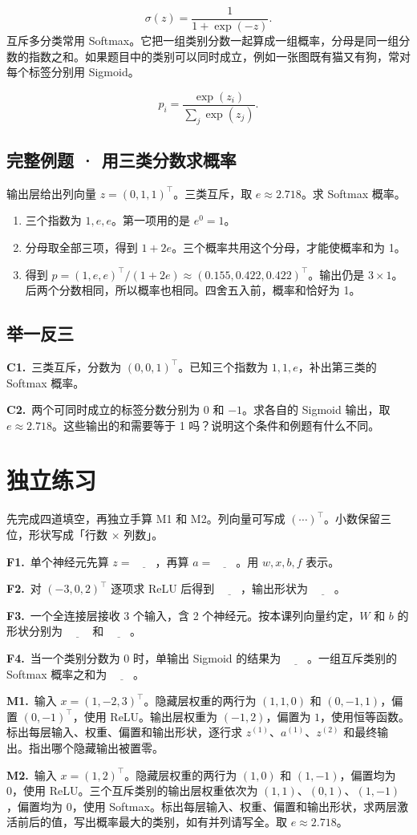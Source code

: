 \documentclass[UTF8,a4paper,11pt]{ctexart}
\newcommand{\PracticeQuestion}[3]{\par\Needspace{4\baselineskip}\noindent\begin{minipage}{\linewidth}\textbf{#1.}\ #2\par\noindent\rule{0pt}{#3mm}\par\end{minipage}\par}
\begin{document}
\[\sigma(z)=\frac{1}{1+\exp(-z)}.\]
互斥多分类常用 Softmax。它把一组类别分数一起算成一组概率，分母是同一组分数的指数之和。如果题目中的类别可以同时成立，例如一张图既有猫又有狗，常对每个标签分别用 Sigmoid。

\[p_i=\frac{\exp(z_i)}{\sum_j\exp(z_j)}.\]
\subsection{完整例题 · 用三类分数求概率}
输出层给出列向量 $z=(0,1,1)^\top$。三类互斥，取 $e\approx2.718$。求 Softmax 概率。

\begin{enumerate}
\item 三个指数为 $1,e,e$。第一项用的是 $e^0=1$。
\item 分母取全部三项，得到 $1+2e$。三个概率共用这个分母，才能使概率和为 1。
\item 得到 $p=(1,e,e)^\top/(1+2e)\approx(0.155,0.422,0.422)^\top$。输出仍是 $3\times1$。后两个分数相同，所以概率也相同。四舍五入前，概率和恰好为 1。
\end{enumerate}
\subsection{举一反三}
\PracticeQuestion{C1}{三类互斥，分数为 $(0,0,1)^\top$。已知三个指数为 $1,1,e$，补出第三类的 Softmax 概率。}{27}
\PracticeQuestion{C2}{两个可同时成立的标签分数分别为 $0$ 和 $-1$。求各自的 Sigmoid 输出，取 $e\approx2.718$。这些输出的和需要等于 1 吗？说明这个条件和例题有什么不同。}{35}
\clearpage
\section{独立练习}
先完成四道填空，再独立手算 M1 和 M2。列向量可写成 $(\cdots)^\top$。小数保留三位，形状写成「行数 $\times$ 列数」。

\PracticeQuestion{F1}{单个神经元先算 $z=\underline{\qquad}$，再算 $a=\underline{\qquad}$。用 $w,x,b,f$ 表示。}{35}
\PracticeQuestion{F2}{对 $(-3,0,2)^\top$ 逐项求 ReLU 后得到 $\underline{\qquad}$，输出形状为 $\underline{\qquad}$。}{35}
\PracticeQuestion{F3}{一个全连接层接收 3 个输入，含 2 个神经元。按本课列向量约定，$W$ 和 $b$ 的形状分别为 $\underline{\qquad}$ 和 $\underline{\qquad}$。}{35}
\PracticeQuestion{F4}{当一个类别分数为 0 时，单输出 Sigmoid 的结果为 $\underline{\qquad}$。一组互斥类别的 Softmax 概率之和为 $\underline{\qquad}$。}{35}
\PracticeQuestion{M1}{输入 $x=(1,-2,3)^\top$。隐藏层权重的两行为 $(1,1,0)$ 和 $(0,-1,1)$，偏置 $(0,-1)^\top$，使用 ReLU。输出层权重为 $(-1,2)$，偏置为 $1$，使用恒等函数。标出每层输入、权重、偏置和输出形状，逐行求 $z^{(1)}$、$a^{(1)}$、$z^{(2)}$ 和最终输出。指出哪个隐藏输出被置零。}{40}
\PracticeQuestion{M2}{输入 $x=(1,2)^\top$。隐藏层权重的两行为 $(1,0)$ 和 $(1,-1)$，偏置均为 0，使用 ReLU。三个互斥类别的输出层权重依次为 $(1,1)$、$(0,1)$、$(1,-1)$，偏置均为 0，使用 Softmax。标出每层输入、权重、偏置和输出形状，求两层激活前后的值，写出概率最大的类别，如有并列请写全。取 $e\approx2.718$。}{34}
\clearpage
\end{document}

